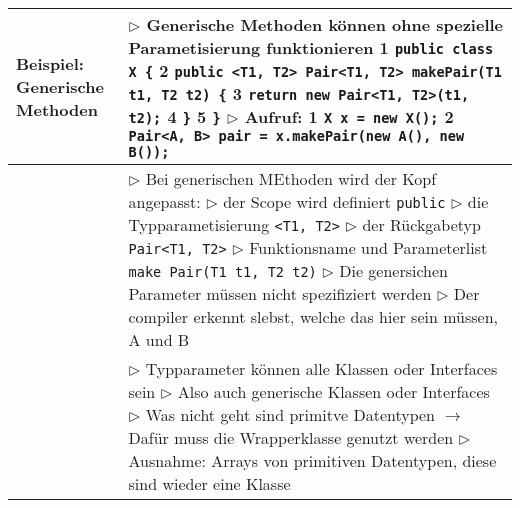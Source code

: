 \begin{table}[H]
\begin{tabular}{ | p{4cm} p{13.5cm} | }
	\makecell[l]{Beispiel: \\ Generische Methoden} & 
	\makecell[l]
	{
	$\rhd$ Generische Methoden können ohne spezielle Parametisierung funktionieren \\
	\hspace{0.5cm} 1 \hspace{0.4cm} \texttt{public class X \{} \\
	\hspace{0.5cm} 2 \hspace{0.6cm} \texttt{public <T1, T2> Pair<T1, T2> makePair(T1 t1, T2 t2) \{} \\
	\hspace{0.5cm} 3 \hspace{0.8cm} \texttt{return new Pair<T1, T2>(t1, t2);} \\
	\hspace{0.5cm} 4 \hspace{0.6cm} \texttt{\}} \\
	\hspace{0.5cm} 5 \hspace{0.4cm} \texttt{\}} \\
	$\rhd$ Aufruf: \\
	\hspace{0.5cm} 1 \hspace{0.4cm} \texttt{X x = new X();} \\
	\hspace{0.5cm} 2 \hspace{0.4cm} \texttt{Pair<A, B> pair = x.makePair(new A(), new B());} \\
	} 	\\ \hline


	\makecell[l]{Generische Methoden} & 
	\makecell[l]
	{
	$\rhd$ Bei generischen MEthoden wird der Kopf angepasst: \\
	$\rhd$ der Scope wird definiert \texttt{public} \\
	$\rhd$ die Typparametisierung \texttt{<T1, T2>} \\
	$\rhd$ der Rückgabetyp \texttt{Pair<T1, T2>} \\
	$\rhd$ Funktionsname und Parameterlist \texttt{make Pair(T1 t1, T2 t2)} \\
	$\rhd$ Die genersichen Parameter müssen nicht spezifiziert werden \\
	$\rhd$ Der compiler erkennt slebst, welche das hier sein müssen, A und B \\
	} 	\\ \hline


	\makecell[l]{Typparamter} & 
	\makecell[l]
	{
	$\rhd$ Typparameter können alle Klassen oder Interfaces sein \\
	$\rhd$ Also auch generische Klassen oder Interfaces \\
	$\rhd$ Was nicht geht sind primitve Datentypen \\
	$\rightarrow$ Dafür muss die Wrapperklasse genutzt werden \\
	$\rhd$ Ausnahme: Arrays von primitiven Datentypen, diese sind wieder eine Klasse \\
	} 	\\ \hline



\end{tabular}
\end{table}
